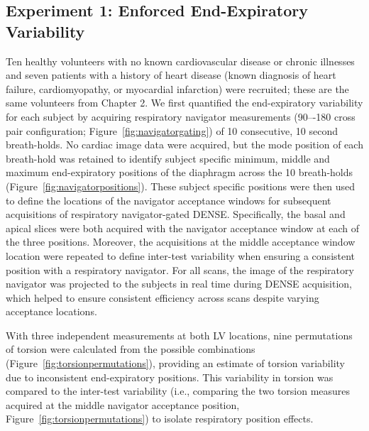\subsection{Experiment 1: Enforced End-Expiratory Variability}
	Ten healthy volunteers with no known cardiovascular disease or chronic illnesses and seven patients with a history of heart disease (known diagnosis of heart failure, cardiomyopathy, or myocardial infarction) were recruited; these are the same volunteers from Chapter 2. We first quantified the end-expiratory variability for each subject by acquiring respiratory navigator measurements (90–-180 cross pair configuration; Figure~\ref{fig:navigatorgating}) of 10 consecutive, 10 second breath-holds. No cardiac image data were acquired, but the mode position of each breath-hold was retained to identify subject specific minimum, middle and maximum end-expiratory positions of the diaphragm across the 10 breath-holds (Figure~\ref{fig:navigatorpositions}). These subject specific positions were then used to define the locations of the navigator acceptance windows for subsequent acquisitions of respiratory navigator-gated DENSE. Specifically, the basal and apical slices were both acquired with the navigator acceptance window at each of the three positions. Moreover, the acquisitions at the middle acceptance window location were repeated to define inter-test variability when ensuring a consistent position with a respiratory navigator. For all scans, the image of the respiratory navigator was projected to the subjects in real time during DENSE acquisition, which helped to ensure consistent efficiency \cite{Hamlet2016} across scans despite varying acceptance locations.
	
	With three independent measurements at both LV locations, nine permutations of torsion were calculated from the possible combinations (Figure~\ref{fig:torsionpermutations}), providing an estimate of torsion variability due to inconsistent end-expiratory positions. This variability in torsion was compared to the inter-test variability (i.e., comparing the two torsion measures acquired at the middle navigator acceptance position, Figure~\ref{fig:torsionpermutations}) to isolate respiratory position effects.

